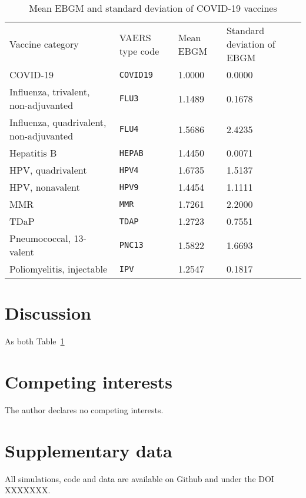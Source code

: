 \documentclass[12pt]{article}
\begin{document}
\begin{table}[]
\begin{tabular}{llll}
Vaccine category                        & VAERS type code & Mean EBGM & Standard deviation of EBGM \\
COVID-19                                & \texttt{COVID19}         & 1.0000    & 0.0000                     \\
Influenza, trivalent, non-adjuvanted    & \texttt{FLU3}            & 1.1489    & 0.1678                     \\
Influenza, quadrivalent, non-adjuvanted & \texttt{FLU4}            & 1.5686    & 2.4235                     \\
Hepatitis B                             & \texttt{HEPAB}           & 1.4450    & 0.0071                     \\
HPV, quadrivalent                       & \texttt{HPV4}            & 1.6735    & 1.5137                     \\
HPV, nonavalent                         & \texttt{HPV9}            & 1.4454    & 1.1111                     \\
MMR                                     & \texttt{MMR}             & 1.7261    & 2.2000                     \\
TDaP                                    & \texttt{TDAP}            & 1.2723    & 0.7551                     \\
Pneumococcal, 13-valent                 & \texttt{PNC13}           & 1.5822    & 1.6693                     \\
Poliomyelitis, injectable               & \texttt{IPV}             & 1.2547    & 0.1817                    
\end{tabular}
\caption{Mean EBGM and standard deviation of COVID-19 vaccines }
\label{tab:comparison_ebgm}
\end{table}



\section{Discussion} %
\label{sec:discussion}

As both Table~\ref{tab:comparison_ebgm}


\section*{Competing interests} %
\label{sec:competing_interests}

The author declares no competing interests.


\section*{Supplementary data} %
\label{sec:supplementary_data}

All simulations, code and data are available on Github and under the DOI XXXXXXX.



\end{document}
